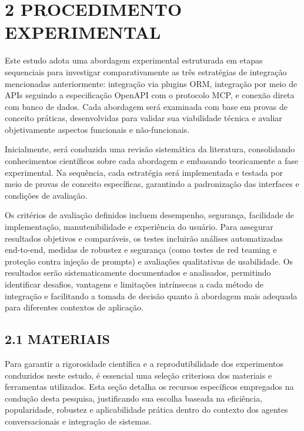 \documentclass[
]{article}
\begin{document}
\section{2 PROCEDIMENTO EXPERIMENTAL}\label{procedimento-experimental}

Este estudo adota uma abordagem experimental estruturada em etapas
sequenciais para investigar comparativamente as três estratégias de
integração mencionadas anteriormente: integração via plugins ORM,
integração por meio de APIs seguindo a especificação OpenAPI com o
protocolo MCP, e conexão direta com banco de dados. Cada abordagem será
examinada com base em provas de conceito práticas, desenvolvidas para
validar sua viabilidade técnica e avaliar objetivamente aspectos
funcionais e não-funcionais.

Inicialmente, será conduzida uma revisão sistemática da literatura,
consolidando conhecimentos científicos sobre cada abordagem e embasando
teoricamente a fase experimental. Na sequência, cada estratégia será
implementada e testada por meio de provas de conceito específicas,
garantindo a padronização das interfaces e condições de avaliação.

Os critérios de avaliação definidos incluem desempenho, segurança,
facilidade de implementação, manutenibilidade e experiência do usuário.
Para assegurar resultados objetivos e comparáveis, os testes incluirão
análises automatizadas end-to-end, medidas de robustez e segurança (como
testes de red teaming e proteção contra injeção de prompts) e avaliações
qualitativas de usabilidade. Os resultados serão sistematicamente
documentados e analisados, permitindo identificar desafios, vantagens e
limitações intrínsecas a cada método de integração e facilitando a
tomada de decisão quanto à abordagem mais adequada para diferentes
contextos de aplicação.

\subsection{2.1 MATERIAIS}\label{materiais}

Para garantir a rigorosidade científica e a reprodutibilidade dos
experimentos conduzidos neste estudo, é essencial uma seleção criteriosa
dos materiais e ferramentas utilizados. Esta seção detalha os recursos
específicos empregados na condução desta pesquisa, justificando sua
escolha baseada na eficiência, popularidade, robustez e aplicabilidade
prática dentro do contexto dos agentes conversacionais e integração de
sistemas.
\end{document}
